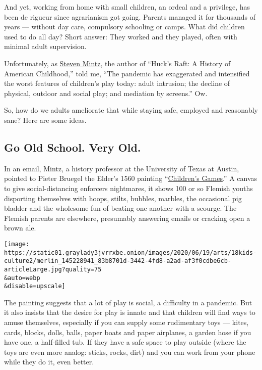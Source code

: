 And yet, working from home with small children, an ordeal and a
privilege, has been de rigueur since agrarianism got going. Parents
managed it for thousands of years --- without day care, compulsory
schooling or camps. What did children used to do all day? Short answer:
They worked and they played, often with minimal adult supervision.

Unfortunately, as
\href{https://liberalarts.utexas.edu/history/faculty/shm654}{Steven
Mintz}, the author of ``Huck's Raft: A History of American Childhood,''
told me, ``The pandemic has exaggerated and intensified the worst
features of children's play today: adult intrusion; the decline of
physical, outdoor and social play; and mediation by screens.'' Ow.

So, how do we adults ameliorate that while staying safe, employed and
reasonably sane? Here are some ideas.

\hypertarget{go-old-school-very-old}{%
\subsection{Go Old School. Very Old.}\label{go-old-school-very-old}}

In an email, Mintz, a history professor at the University of Texas at
Austin, pointed to Pieter Bruegel the Elder's 1560 painting
``\href{https://artsandculture.google.com/asset/children\%E2\%80\%99s-games-pieter-bruegel-the-elder/CQEeZWQPOI2Yjg?hl=en}{Children's
Games}.'' A canvas to give social-distancing enforcers nightmares, it
shows 100 or so Flemish youths disporting themselves with hoops, stilts,
bubbles, marbles, the occasional pig bladder and the wholesome fun of
beating one another with a scourge. The Flemish parents are elsewhere,
presumably answering emails or cracking open a brown ale.

\texttt{[image: https://static01.graylady3jvrrxbe.onion/images/2020/06/19/arts/18kids-culture2/merlin\_145228941\_83b8701d-3442-4fd8-a2ad-af3f0cdbe6cb-articleLarge.jpg?quality=75\\\&auto=webp\\\&disable=upscale]}

The painting suggests that a lot of play is social, a difficulty in a
pandemic. But it also insists that the desire for play is innate and
that children will find ways to amuse themselves, especially if you can
supply some rudimentary toys --- kites, cards, blocks, dolls, balls,
paper boats and paper airplanes, a garden hose if you have one, a
half-filled tub. If they have a safe space to play outside (where the
toys are even more analog: sticks, rocks, dirt) and you can work from
your phone while they do it, even better.

